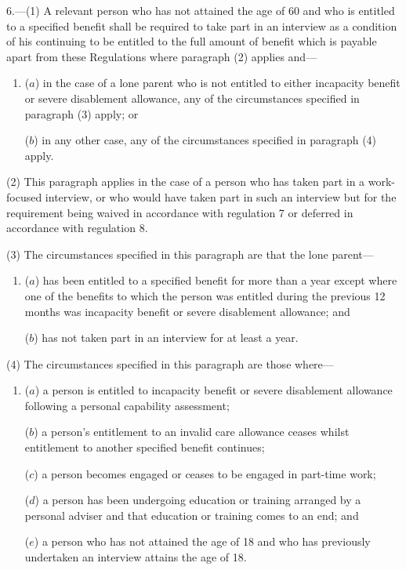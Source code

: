 \documentclass[12pt,a4paper]{article}
\begin{document}
6.—(1)  A relevant person who has not attained the age of 60 and who is entitled to a specified benefit shall be required to take part in an interview as a condition of his continuing to be entitled to the full amount of benefit which is payable apart from these Regulations where paragraph (2) applies and—
\begin{enumerate}\item[]
($a$) in the case of a lone parent who is not entitled to either incapacity benefit or severe disablement allowance, any of the circumstances specified in paragraph (3) apply; or

($b$) in any other case, any of the circumstances specified in paragraph (4) apply.
\end{enumerate}

(2) This paragraph applies in the case of a person who has taken part in a work-focused interview, or who would have taken part in such an interview but for the requirement being waived in accordance with regulation 7 or deferred in accordance with regulation 8.

(3) The circumstances specified in this paragraph are that the lone parent—
\begin{enumerate}\item[]
($a$)  has been entitled to a specified benefit for more than a year except where one of the benefits to which the person was entitled during the previous 12 months was incapacity benefit or severe disablement allowance; and

($b$) has not taken part in an interview for at least a year.
\end{enumerate}

(4) The circumstances specified in this paragraph are those where—
\begin{enumerate}\item[]
($a$) a person is entitled to incapacity benefit or severe disablement allowance following a personal capability assessment;

($b$) a person’s entitlement to an invalid care allowance ceases whilst entitlement to another specified benefit continues;

($c$) a person becomes engaged or ceases to be engaged in part-time work;

($d$) a person has been undergoing education or training arranged by a personal adviser and that education or training comes to an end; and

($e$) a person who has not attained the age of 18 and who has previously undertaken an interview attains the age of 18.
\end{enumerate}
\end{document}
